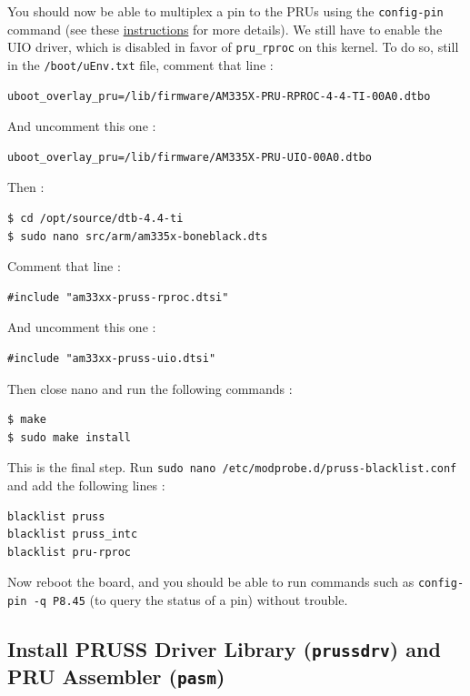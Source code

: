 \documentclass[]{report}
\begin{document}
You should now be able to multiplex a pin to the PRUs using the
\texttt{config-pin} command (see these
\href{Documentation/pins.md}{instructions} for more details). We still
have to enable the UIO driver, which is disabled in favor of
\texttt{pru\_rproc} on this kernel. To do so, still in the
\texttt{/boot/uEnv.txt} file, comment that line :

\begin{verbatim}
uboot_overlay_pru=/lib/firmware/AM335X-PRU-RPROC-4-4-TI-00A0.dtbo
\end{verbatim}

And uncomment this one :

\begin{verbatim}
uboot_overlay_pru=/lib/firmware/AM335X-PRU-UIO-00A0.dtbo
\end{verbatim}

Then :

\begin{verbatim}
$ cd /opt/source/dtb-4.4-ti
$ sudo nano src/arm/am335x-boneblack.dts
\end{verbatim}

Comment that line :

\begin{verbatim}
#include "am33xx-pruss-rproc.dtsi"
\end{verbatim}

And uncomment this one :

\begin{verbatim}
#include "am33xx-pruss-uio.dtsi"
\end{verbatim}

Then close nano and run the following commands :

\begin{verbatim}
$ make
$ sudo make install
\end{verbatim}

This is the final step. Run
\texttt{sudo\ nano\ /etc/modprobe.d/pruss-blacklist.conf} and add the
following lines :

\begin{verbatim}
blacklist pruss
blacklist pruss_intc
blacklist pru-rproc
\end{verbatim}

Now reboot the board, and you should be able to run commands such as
\texttt{config-pin\ -q\ P8.45} (to query the status of a pin) without trouble.

\hypertarget{install-pruss-driver-library-prussdrv-and-pru-assembler-pasm}{%
\subsection{\texorpdfstring{Install PRUSS Driver Library
(\texttt{prussdrv}) and PRU Assembler
(\texttt{pasm})}{Install PRUSS Driver Library (prussdrv) and PRU Assembler (pasm)}}\label{install-pruss-driver-library-prussdrv-and-pru-assembler-pasm}}
\end{document}
